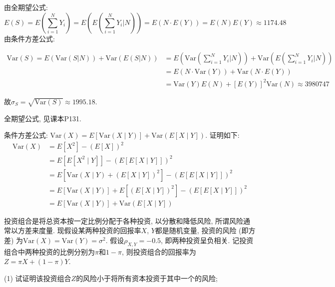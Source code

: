 \documentclass[standard]{ExBook}
\begin{document}
\begin{qitems}
    \begin{bbox}
由全期望公式:
$$E(S)=E(\sum\limits_{i=1}^{N}Y_{i})=E(E(\sum\limits_{i=1}^{N}Y_{i}|N))=E(N\cdot E(Y))=E(N)E(Y)\approx 1174.48$$
由条件方差公式:
\vspace{-2em}
\begin{center}
\begin{equation}
    \begin{array}{ll}
        \nonumber
\mathrm{Var}(S)=E(\mathrm{Var}(S|N))+\mathrm{Var}(E(S|N)) & =E(\mathrm{Var}(\sum\limits_{i=1}^{N}Y_{i}|N))+\mathrm{Var}(E(\sum\limits_{i=1}^{N}Y_{i}|N))\\
& =E(N \cdot \mathrm{Var}(Y))+\mathrm{Var}(N \cdot E(Y))\\
& =\mathrm{Var}(Y)E(N)+\left[E(Y)\right]^2 \mathrm{Var}(N)\approx3980747
    \end{array}
\end{equation}
\end{center}
故$\sigma_{S}=\sqrt{\mathrm{Var}(S)}\approx1995.18$.

\textcolor{themeColor}{\selectfont {} 全期望公式, 见课本P131.}

\textcolor{themeColor}{\selectfont {} 条件方差公式: $\text{Var}(X) = E[\text{Var}(X \mid Y)] + \text{Var}(E[X \mid Y])$. 证明如下:
\[
\begin{aligned}
\text{Var}(X) &= E[X^2] - (E[X])^2 \\
&= E[E[X^2 \mid Y]] - (E[E[X \mid Y]])^2 \\
&= E[\text{Var}(X \mid Y) + (E[X \mid Y])^2] - (E[E[X \mid Y]])^2 \\
&= E[\text{Var}(X \mid Y)] + E[(E[X \mid Y])^2] - (E[E[X \mid Y]])^2 \\
&= E[\text{Var}(X \mid Y)] + \text{Var}(E[X \mid Y])
\end{aligned}
\]}
    \end{bbox}

\vspace{-5em}

    \begin{bbox}
    \begin{shaded}
        \qitem
投资组合是将总资本按一定比例分配于各种投资, 以分散和降低风险, 所谓风险通常以方差来度量. 现假设某两种投资的回报率$X$, $Y$都是随机变量, 投资的风险 (即方差) 为$\mathrm{Var}(X)=\mathrm{Var}(Y)=\sigma^2$. 假设$\rho_{X,Y}=-0.5$, 即两种投资呈负相关. 记投资组合中两种投资的比例分别为$\pi$和$1-\pi$, 则投资组合的回报率为$Z=\pi X+(1-\pi)Y$.

(1) 试证明该投资组合$Z$的风险小于将所有资本投资于其中一个的风险;


\end{shaded}
\end{bbox}
\end{qitems}
\end{document}
